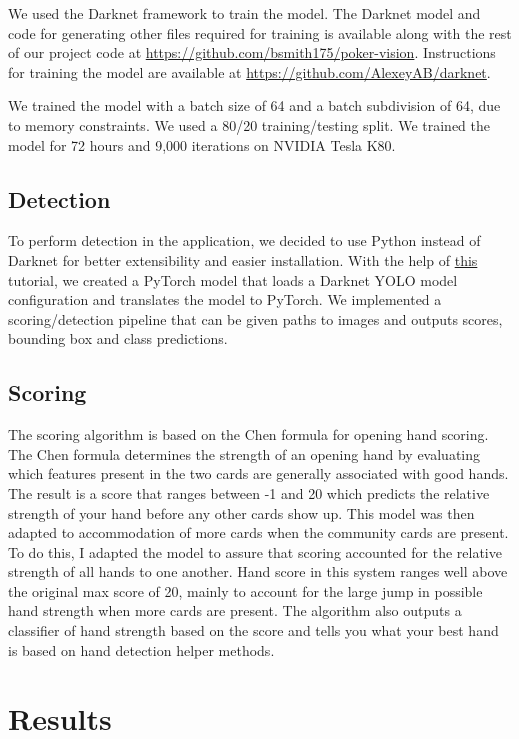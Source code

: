 \documentclass[10pt,twocolumn,letterpaper]{article}
\begin{document}
We used the Darknet framework to train the model. The Darknet model and code for generating other files required for training is available along with the rest of our project code at \url{https://github.com/bsmith175/poker-vision}. Instructions for training the model are available at \url{https://github.com/AlexeyAB/darknet}.

We trained the model with a batch size of 64 and a batch subdivision of 64, due to memory constraints. We used a 80/20 training/testing split. We trained the model for 72 hours and 9,000 iterations on NVIDIA Tesla K80. 

\subsection{Detection}

To perform detection in the application, we decided to use Python instead of Darknet for better extensibility and easier installation. With the help of \hyperlink{https://blog.paperspace.com/how-to-implement-a-yolo-object-detector-in-pytorch/}{this} tutorial, we created a PyTorch model that loads a Darknet YOLO model configuration and translates the model to PyTorch. We implemented a scoring/detection pipeline that can be given paths to images and outputs scores, bounding box and class predictions. 

\subsection{Scoring}
The scoring algorithm is based on the Chen formula for opening hand scoring. The Chen formula determines the strength of an opening hand by evaluating which features present in the two cards are generally associated with good hands. The result is a score that ranges between -1 and 20 which predicts the relative strength of your hand before any other cards show up. This model was then adapted to accommodation of more cards when the community cards are present. To do this, I adapted the model to assure that scoring accounted for the relative strength of all hands to one another. Hand score in this system ranges well above the original max score of 20, mainly to account for the large jump in possible hand strength when more cards are present. The algorithm also outputs a classifier of hand strength based on the score and tells you what your best hand is based on hand detection helper methods. 

\section{Results}
\end{document}
